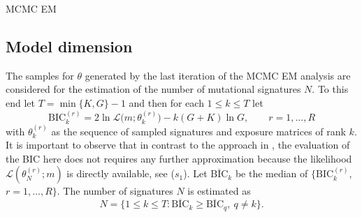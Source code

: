 \documentclass{bioinfo}
\makeatletter
\def\BState{\State\hskip-\ALG@thistlm}
\makeatother
\begin{document}
\begin{algorithm}
\caption{MCMC EM}\label{alg:mcmcem}
\end{algorithm}

\subsection{Model dimension}
The samples for $\theta$ generated by the last iteration of the
MCMC EM analysis are considered for the estimation of the number
of mutational signatures $N$. To this end let $T = \min\{K, G\} - 1$
and then for each $1 \leq k \leq T$ let
\[
  \text{BIC}_k^{(r)} = 2\ln\mathcal L\big(m;
    \theta^{(r)}_{k}\big) - k(G+K)\ln G, \qquad r =1, \ldots,
    R
\]
with $\theta^{(r)}_k$ as the sequence of sampled signatures and
exposure matrices of rank $k$. It is important to observe that in
contrast to the approach in \cite{FICMV}, the evaluation of the BIC
here does not requires any further approximation because the
likelihood $\mathcal L(\theta^{(r)}_N; m)$ is directly available, see
($s_1$).  Let $\overline{\text{BIC}}_k$ be the median of
$\{\text{BIC}_k^{(r)}$, $r = 1, \ldots, R\}$. The number of signatures
$N$ is estimated as
\[
   N
   =
   \big\{1 \leq k \leq T:  \overline{\text{BIC}}_k \geq
    \overline{\text{BIC}}_q,\ q\neq k \big\}.
\]
\end{document}
